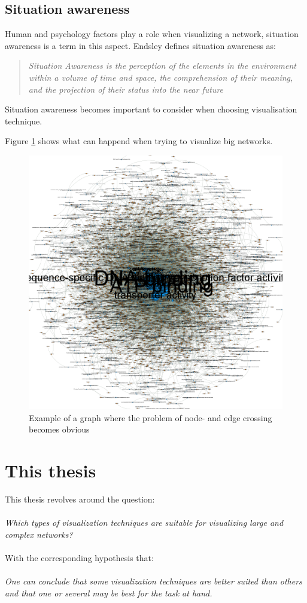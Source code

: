 \documentclass[a4paper,11pt]{kth-mag}
\begin{document}
\subsection{Situation awareness}
Human and psychology factors play a role when visualizing a network, situation awareness is a term in this aspect. Endsley\cite{195097} defines situation awareness as:
\begin{quote}
\emph{Situation Awareness is the perception of the elements in the environment within a volume of time and space, the comprehension of their meaning, and
the projection of their status into the near future}
\end{quote}
Situation awareness becomes important to consider when choosing visualisation technique.

Figure \ref{fig:hair_ball} shows  what can happend when trying to visualize big networks.

\newpage
\begin{figure}[!htbp]
	\centering
	\includegraphics[scale=0.4]{HairBallGraph}
	\caption{Example of a graph where the problem of node- and edge crossing becomes obvious}
	\label{fig:hair_ball}
\end{figure}
\newpage
\section{This thesis}
This thesis revolves around the question:\\
\\
\emph{Which types of visualization techniques are suitable for visualizing large and complex networks?}\\
\\
With the corresponding hypothesis that:\\
\\
\emph{One can conclude that some visualization techniques are better suited than others and that one or several may be best for the task at hand.}
\\
\end{document}
